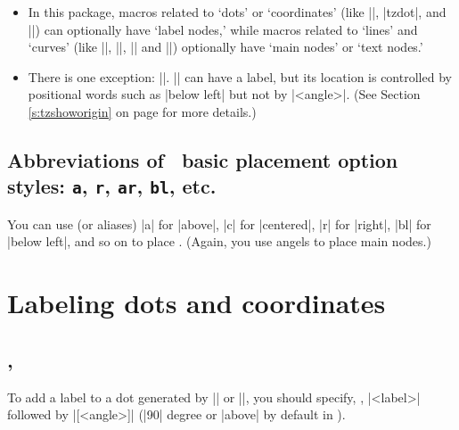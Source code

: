 \remark
\begin{itemize}
\item
In this package, macros related to `dots' or `coordinates' (like |\tzcdot|, |tzdot|, and |\tzcoor|) can optionally have `label nodes,' while macros related to `lines' and `curves' (like |\tzline|, |\tzto|, |\tzbezier| and |\tzparabola|) optionally have `main nodes' or `text nodes.'
\item
There is one exception: |\tzshoworigin|. |\tzshoworigin| can have a label, but its location is controlled by positional words such as |below left| but not by |<angle>|.
(See Section \ref{s:tzshoworigin} on page \pageref{s:tzshoworigin} for more details.)
\end{itemize}

\subsection{Abbreviations of \Tikz\ basic placement option styles: \texttt{a}, \texttt{r}, \texttt{ar}, \texttt{bl}, etc.}
\label{ssi:abbreviations}

You can use  (or aliases) |a| for |above|, |c| for |centered|, |r| for |right|, |bl| for |below left|, and so on to place .
(Again, you  use angels to place main nodes.)

\begin{tzcode}{.3}
\end{tzcode}

\section{Labeling dots and coordinates}
\label{si:labelingdots}

\subsection{\protect\cmd{\tzdot}, \protect\cmd{\tzcdot}}
\label{ssi:labeling:tzdot}

To add a label to a dot generated by |\tzdot| or |\tzcdot|, you should specify, , |{<label>}| followed by |[<angle>]| (|90| degree or |above| by default in \Tikz).

